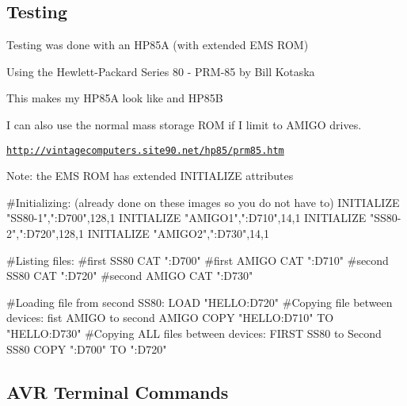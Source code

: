 {\bfseries \subsection*{Testing}}

{\bfseries 
\begin{DoxyItemize}
\item Testing was done with an H\+P85A (with extended E\+MS R\+OM)
\begin{DoxyItemize}
\item Using the Hewlett-\/\+Packard Series 80 -\/ P\+R\+M-\/85 by Bill Kotaska
\item This makes my H\+P85A look like and H\+P85B
\begin{DoxyItemize}
\item I can also use the normal mass storage R\+OM if I limit to A\+M\+I\+GO drives.
\item \href{http://vintagecomputers.site90.net/hp85/prm85.htm}{\tt http\+://vintagecomputers.\+site90.\+net/hp85/prm85.\+htm}
\end{DoxyItemize}
\end{DoxyItemize}
\item Note\+: the E\+MS R\+OM has extended I\+N\+I\+T\+I\+A\+L\+I\+ZE attributes 
\begin{DoxyPre}
  #Initializing: (already done on these images so you do not have to)
  INITIALIZE "SS80-1",":D700",128,1
  INITIALIZE "AMIGO1",":D710",14,1
  INITIALIZE "SS80-2",":D720",128,1
  INITIALIZE "AMIGO2",":D730",14,1\end{DoxyPre}

\end{DoxyItemize}}

{\bfseries 
\begin{DoxyPre}  #Listing files:
  #first SS80
  CAT ":D700"
  #first AMIGO
  CAT ":D710"
  #second SS80
  CAT ":D720"
  #second AMIGO
  CAT ":D730"\end{DoxyPre}
}

{\bfseries 
\begin{DoxyPre}  #Loading file from second SS80:
  LOAD "HELLO:D720"
  #Copying file between devices: fist AMIGO to second AMIGO
  COPY "HELLO:D710" TO "HELLO:D730"
  #Copying ALL files between devices: FIRST SS80 to Second SS80
  COPY ":D700" TO ":D720"
\end{DoxyPre}
 

}

{\bfseries \subsection*{A\+VR Terminal Commands}}

